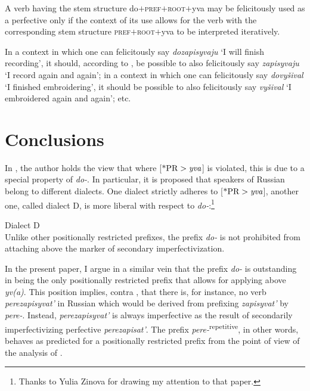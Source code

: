 \documentclass[output=paper,
colorlinks,
citecolor=brown,
newtxmath
]{langscibook}
\begin{document}

\eanoraggedright\label{ggg}
A verb having the stem structure do$+$\textsc{pref}$+$\textsc{root}$+$yva may be felicitously used as a perfective only if the context of its use allows for the verb with the corresponding stem structure \textsc{pref}$+$\textsc{root}$+$yva to be interpreted iteratively.
\z

\noindent In a context in which one can felicitously say \textit{dozapisyvaju} `I will finish recording', it should, according to , be possible to also felicitously say \textit{zapisyvaju} `I record again and again'; in a context in which one can felicitously say \textit{dovyšival} `I finished embroidering', it should be possible to also felicitously say \textit{vyšival} `I embroidered again and again'; etc.
%
%
\section{Conclusions}\label{concl}
In \citet{Tatevosov2013b}, the author holds the view that where [$\text{*PR}>\text{\textit{yva}}$] is violated, this is due to a special property of \textit{do-}. In particular, it is proposed that speakers of Russian belong to different dialects. One dialect strictly adheres to [$\text{*PR}>\text{\textit{yva}}$], another one, called dialect D, is more liberal with respect to \textit{do-}:\footnote{Thanks to Yulia Zinova for drawing my attention to that paper.}


\eanoraggedright
Dialect D\\Unlike other positionally restricted prefixes, the prefix \textit{do-} is not prohibited from attaching above the marker of secondary imperfectivization.
\z

\noindent In the present paper, I argue in a similar vein that the prefix \textit{do-} is outstanding in being the only positionally restricted prefix that allows for applying above \textit{yv(a)}.
This position implies, contra \citet{Zinova.Filip2015}, that there is, for instance, no verb \textit{perezapisyvat'} in Russian which would be
derived from prefixing  \textit{zapisyvat'} by \textit{pere-}.
Instead, \textit{perezapisyvat'} is always imperfective as the result of secondarily imperfectivizing perfective \textit{perezapisat'}. The prefix \textit{pere-}\textsuperscript{repetitive}, in other words, behaves as predicted for a positionally restricted prefix from the point of view of the analysis of \citet{Tatevosov2009,Tatevosov2013a}.
\end{document}
